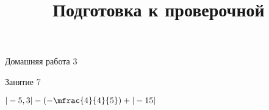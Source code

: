 \begin{homework}[number=3]
	\begin{listofex}
		\item Домашняя работа 3
	\end{listofex}
\end{homework}

\begin{class}[number=7]
	\title{Подготовка к проверочной}
	\begin{listofex}
		\item Занятие 7
	\end{listofex}
\end{class}

\begin{exam}
	\begin{listofex}
		\item \( |-5,3| - \left(-\mfrac{4}{4}{5}\right) + |-15| \)
	\end{listofex}
\end{exam}

